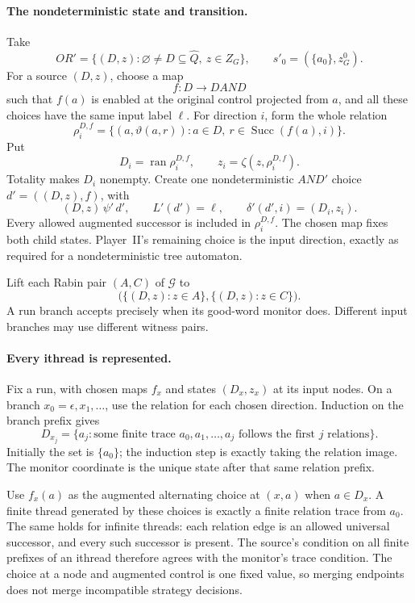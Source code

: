 \paragraph{The nondeterministic state and transition.}
Take
\[
 OR'=\{(D,z):\varnothing\ne D\subseteq\widehat Q,\ z\in Z_G\},
 \qquad s'_0=(\{a_0\},z_G^0).
\]
For a source \((D,z)\),
choose a map
\[
 f:D\longrightarrow DAND
\]
such that \(f(a)\)
is enabled at the
original control projected
from \(a\), and all
these choices have the
same input label \(\ell\).
For direction \(i\),
form the whole relation
\[
 \rho_i^{D,f}
   =\{(a,\vartheta(a,r)):
               a\in D,\ r\in\operatorname{Succ}(f(a),i)\}.
\]
Put
\[
 D_i=\operatorname{ran}\rho_i^{D,f},
 \qquad z_i=\zeta(z,\rho_i^{D,f}).
\]
Totality makes \(D_i\)
nonempty.
Create one nondeterministic
\(AND'\) choice
\(d'=((D,z),f)\), with
\[
 (D,z)\,\psi'\,d',\qquad
 L'(d')=\ell,\qquad
 \delta'(d',i)=(D_i,z_i).
\]
Every allowed augmented
successor is included in
\(\rho_i^{D,f}\).
The chosen map fixes
both child states.
Player~II's remaining
choice is the input
direction, exactly as
required for a nondeterministic
tree automaton.

Lift each Rabin pair
\((A,C)\) of \(\mathcal G\)
to
\[
 \bigl(\{(D,z):z\in A\},\{(D,z):z\in C\}\bigr).
\]
A run branch accepts
precisely when its
good-word monitor does.
Different input branches
may use different
witness pairs.

\paragraph{Every ithread is represented.}
Fix a run, with
chosen maps \(f_x\)
and states \((D_x,z_x)\)
at its input nodes.
On a branch
\(x_0=\epsilon,x_1,\ldots\),
use the relation for
each chosen direction.
Induction on the branch
prefix gives
\[
 D_{x_j}=
 \{a_j:\text{some finite trace }
   a_0,a_1,\ldots,a_j
   \text{ follows the first }j\text{ relations}\}.
\]
Initially the set is
\(\{a_0\}\); the
induction step is
exactly taking the
relation image.
The monitor coordinate
is the unique state
after that same relation
prefix.

Use \(f_x(a)\) as
the augmented alternating
choice at \((x,a)\)
when \(a\in D_x\).
A finite thread generated
by these choices is
exactly a finite relation
trace from \(a_0\).
The same holds for
infinite threads: each
relation edge is an
allowed universal successor,
and every such successor
is present.
The source's condition
on all finite prefixes
of an ithread therefore
agrees with the monitor's
trace condition.
The choice at a node
and augmented control
is one fixed value,
so merging endpoints
does not merge incompatible
strategy decisions.

